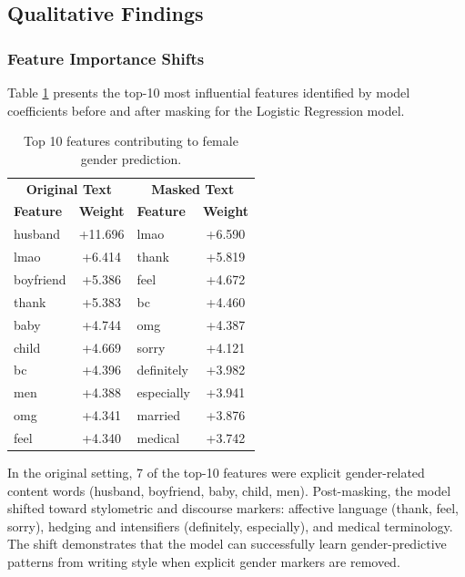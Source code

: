 \documentclass[11pt]{article}
\begin{document}
\subsection{Qualitative Findings}

\subsubsection{Feature Importance Shifts}

Table \ref{tab:features} presents the top-10 most influential features identified by model coefficients before and after masking for the Logistic Regression model.

\begin{table}[h]
\centering
\small
\begin{tabular}{lc|lc}
\toprule
\multicolumn{2}{c|}{\textbf{Original Text}} & \multicolumn{2}{c}{\textbf{Masked Text}} \\
\textbf{Feature} & \textbf{Weight} & \textbf{Feature} & \textbf{Weight} \\
\midrule
husband    & +11.696 & lmao        & +6.590 \\
lmao       & +6.414  & thank       & +5.819 \\
boyfriend  & +5.386  & feel        & +4.672 \\
thank      & +5.383  & bc          & +4.460 \\
baby       & +4.744  & omg         & +4.387 \\
child      & +4.669  & sorry       & +4.121 \\
bc         & +4.396  & definitely  & +3.982 \\
men        & +4.388  & especially  & +3.941 \\
omg        & +4.341  & married     & +3.876 \\
feel       & +4.340  & medical     & +3.742 \\
\bottomrule
\end{tabular}
\caption{Top 10 features contributing to female gender prediction.}
\label{tab:features}
\end{table}

In the original setting, 7 of the top-10 features were explicit gender-related content words (husband, boyfriend, baby, child, men). Post-masking, the model shifted toward stylometric and discourse markers: affective language (thank, feel, sorry), hedging and intensifiers (definitely, especially), and medical terminology. The shift demonstrates that the model can successfully learn gender-predictive patterns from writing style when explicit gender markers are removed.
\end{document}
